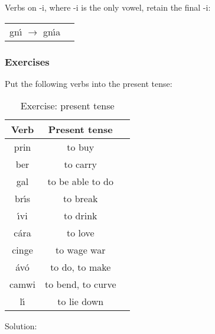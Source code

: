 Verbs on -i, where -i is the only vowel, retain the final -i:
\begin{table}[H]
\begin{tabular}{ll}
  gn\'{\i} $\rightarrow$ gn\'{\i}a
\end{tabular}
\label{examples_verbs_on_i_only_vowel}
\end{table}

\newpage
\subsubsection{Exercises}
Put the following verbs into the present tense:
\begin{table}[H]
\centering
\begin{tabular}{|c|c|M{10.0cm}|}
  \toprule
  \textbf{Verb} & \textbf{Present tense}\\
  \toprule
  prin & to buy & \\
  \midrule
  ber & to carry & \\
  \midrule
  gal & to be able to do & \\
  \midrule
  br\'{\i}s & to break & \\
  \midrule
  \'{\i}vi & to drink & \\
  \midrule
  c\'{a}ra & to love & \\
  \midrule
  cinge & to wage war & \\
  \midrule
  \'{a}v\'{o} & to do, to make & \\
  \midrule
  camwi & to bend, to curve & \\
  \midrule
  l\'{\i} & to lie down & \\
  \bottomrule
\end{tabular}
\caption{Exercise: present tense}
\label{exercise_present_tense}
\end{table}

\newpage
Solution:
\begin{table}[H]
\centering
{}
\label{solution_present_tense}
\caption{Solution: present tense}
\end{table}
\newpage

